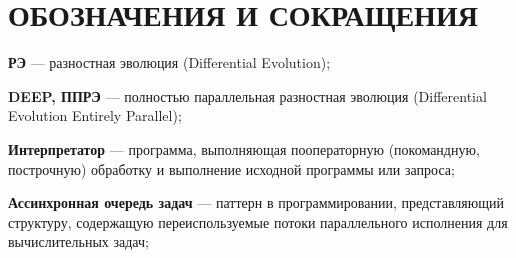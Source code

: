 \chapter*{ОБОЗНАЧЕНИЯ И СОКРАЩЕНИЯ}

\textbf{РЭ} ---
разностная эволюция (Differential Evolution);

\textbf{DEEP, ППРЭ} ---
полностью параллельная разностная эволюция
(Differential Evolution Entirely Parallel);

\textbf{Интерпретатор} ---
программа, выполняющая пооператорную
(покомандную, построчную) обработку
и выполнение исходной программы или запроса;

\textbf{Ассинхронная очередь задач} --- 
паттерн в программировании,
представляющий структуру,
содержащую переиспользуемые
потоки параллельного исполнения
для вычислительных задач;
